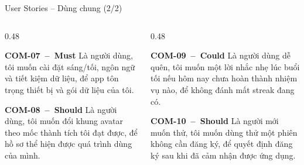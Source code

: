 \documentclass[aspectratio=169]{beamer}
\begin{document}
\begin{frame}{User Stories -- Dùng chung (2/2)}
  \begin{columns}
    \begin{column}{0.48\textwidth}
      \begin{block}{\scriptsize\bfseries COM-07~--~Must}
        {\tiny Là người dùng, tôi muốn cài đặt sáng/tối, ngôn ngữ và tiết kiệm dữ liệu, để app tôn trọng thiết bị và gói dữ liệu của tôi.}
      \end{block}
      \begin{block}{\scriptsize\bfseries COM-08~--~Should}
        {\tiny Là người dùng, tôi muốn đổi khung avatar theo mốc thành tích tôi đạt được, để hồ sơ thể hiện được quá trình dùng của mình.}
      \end{block}
    \end{column}
    \begin{column}{0.48\textwidth}
      \begin{block}{\scriptsize\bfseries COM-09~--~Could}
        {\tiny Là người dùng dễ quên, tôi muốn một lời nhắc nhẹ lúc buổi tối nếu hôm nay chưa hoàn thành nhiệm vụ nào, để không đánh mất streak đang có.}
      \end{block}
      \begin{block}{\scriptsize\bfseries COM-10~--~Should}
        {\tiny Là người mới muốn thử, tôi muốn dùng thử một phiên không cần đăng ký, để quyết định đăng ký sau khi đã cảm nhận được ứng dụng.}
      \end{block}
    \end{column}
  \end{columns}
\end{frame}
\end{document}
